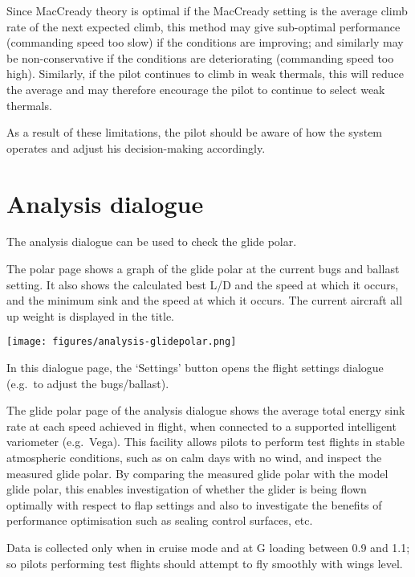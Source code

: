 Since MacCready theory is optimal if the MacCready setting is the
average climb rate of the next expected climb, this method may give
sub-optimal performance (commanding speed too slow) if the conditions
are improving; and similarly may be non-conservative if the conditions
are deteriorating (commanding speed too high).  Similarly, if the pilot
continues to climb in weak thermals, this will reduce the average
and may therefore encourage the pilot to continue to select weak thermals.

As a result of these limitations, the pilot should be aware of how the
system operates and adjust his decision-making accordingly.


\section{Analysis dialogue}

The analysis dialogue can be used to check the glide polar.  

The polar page shows a graph of the glide polar at the current bugs
and ballast setting.  It also shows the calculated best L/D and the
speed at which it occurs, and the minimum sink and the speed at which
it occurs.  The current aircraft all up weight is displayed in the
title.

\begin{center}
\texttt{[image: figures/analysis-glidepolar.png]}
\end{center}

In this dialogue page, the `Settings' button opens the flight settings
dialogue (e.g.\ to adjust the bugs/ballast).

The glide polar page of the analysis dialogue shows the average total
energy sink rate at each speed achieved in flight, when connected to a
supported intelligent variometer (e.g.\ Vega).  This facility allows
pilots to perform test flights in stable atmospheric conditions, such
as on calm days with no wind, and inspect the measured glide polar.
By comparing the measured glide polar with the model glide polar, this
enables investigation of whether the glider is being flown optimally
with respect to flap settings and also to investigate the benefits of
performance optimisation such as sealing control surfaces, etc.

Data is collected only when in cruise mode and at G loading between
0.9 and 1.1; so pilots performing test flights should attempt to fly
smoothly with wings level.

